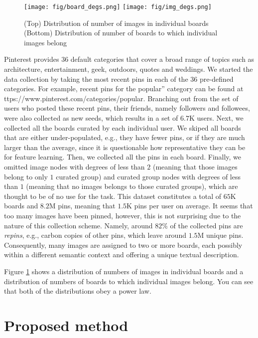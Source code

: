 \documentclass[letterpaper]{article} %
\begin{document}
\begin{figure}[t]
  \centering
  \texttt{[image: fig/board\_degs.png]}
  \texttt{[image: fig/img\_degs.png]}
  \caption{%
    (Top)    Distribution of number of images in individual boards
    (Bottom) Distribution of number of boards to which individual images belong
  }
  \label{fig:degs}
\end{figure}

Pinterest provides 36 default categories that cover a broad range of topics such as architecture, entertainment, geek, outdoors, quotes and weddings.
We started the data collection by taking the most recent pins in each of the 36 pre-defined categories.
For example, recent pins for the popular” category can be found at ttps://www.pinterest.com/categories/popular. %
Branching out from the set of users who posted these recent pins, their friends, namely followers and followees, were also collected as new seeds, which results in a set of $6.7$K users.
Next, we collected all the boards curated by each individual user.
We skiped all boards that are either under-populated, e.g., they have fewer pins, or if they are much larger than the average, since it is questionable how representative they can be for feature learning.
Then, we collected all the pins in each board.
Finally, we omitted image nodes with degrees of less than $2$ (meaning that those images belong to only $1$ curated group) and curated group nodes with degrees of less than $1$ (meaning that no images belongs to those curated groups), which are thought to be of no use for the task.
This dataset constitutes a total of $65$K boards and $8.2$M pins, meaning that $1.5$K pins per user on average.
It seems that too many images have been pinned, however, this is not surprising due to the nature of this collection scheme.
Namely, around $82$\% of the collected pins are \emph{repins}, e.g., carbon copies of other pins, which leave around $1.5$M unique pins.
Consequently, many images are assigned to two or more boards, each possibly within a different semantic context and offering a unique textual description.

Figure \ref{fig:degs} shows a distribution of numbers of images in individual boards and a distribution of numbers of boards to which individual images belong.
You can see that both of the distributions obey a power law.


\section{Proposed method}
\label{sec:proposed}
\end{document}
